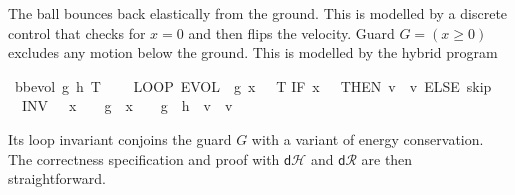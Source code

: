 \documentclass[envcountsame,envcountsect]{llncs}
\newcommand{\IF}[3]{\mathbf{if}\ #1\ \mathbf{then}\ #2\ \mathbf{else}\ #3}
\newcommand{\dH}{\mathsf{d}\mathcal{H}}
\newcommand{\dR}{\mathsf{d}\mathcal{R}}
\newcommand{\flow}{\varphi}
\newcommand{\reals}{\mathbb{R}}
\begin{document}
\begin{example}
\noindent The ball bounces back elastically
from the ground. This is modelled by a
discrete control that checks for $x=0$ and then flips the
velocity.  Guard $G=(x\geq 0)$ excludes any motion
below the ground. This is modelled by the hybrid
program~\cite{Platzer18}
\begin{isabellebody}
\isanewline
{}\isamarkupfalse%
\ {\isachardoublequoteopen}bb{\isacharunderscore}evol\ g\ h\ T\ {\isasymequiv}\ \isanewline
\ \ LOOP\
{\isacharparenleft}EVOL\
{\isacharparenleft}{\isasymphi}\ g{\isacharparenright}\
{\isacharparenleft}x\ {\isasymge}\ {}{\isacharparenright}\
T{\isacharsemicolon} {\isacharparenleft}IF\ {\isacharparenleft}x\ {\isacharequal}\ {}{\isacharparenright}\ THEN\ {\isacharparenleft}v\ {\isacharcolon}{\isacharcolon}{\isacharequal}\ {\isacharminus}v{\isacharparenright}\ ELSE\ skip{\isacharparenright}{\isacharparenright}\ \isanewline
\ \   INV\ {\isacharparenleft}{}\ {\isasymle}\ x\ {\isasymand}\ {}\ {\isasymcdot}\ g\ {\isasymcdot}\ x\ {\isacharequal}\ {}\ {\isasymcdot}\ g\ {\isasymcdot}\ h\ {\isacharplus}\ v\ {\isasymcdot}\ v{\isacharparenright}{\isachardoublequoteclose}\isanewline
\end{isabellebody}
\noindent Its loop invariant conjoins the guard $G$ with a
variant of energy conservation. The correctness
specification and proof with $\dH$ and $\dR$ are then straightforward.

\end{example}
\end{document}
